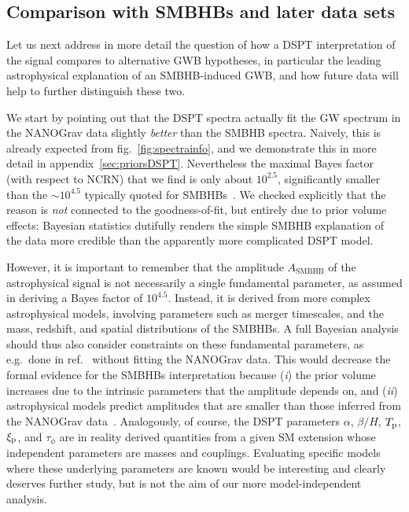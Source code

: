 \subsection{Comparison with SMBHBs and later data sets}
\label{sec:results_comp}

Let us next address in more detail the question of how a \ac{DSPT} interpretation of the signal compares to alternative \ac{GWB} hypotheses, in particular the leading astrophysical explanation of an \ac{SMBHB}-induced \ac{GWB}, and how future data will help to further distinguish these two.

We start by pointing out that the \ac{DSPT} spectra actually fit the \ac{GW} spectrum in the \ac{NANOGrav} data slightly \textit{better}  than the \ac{SMBHB} spectra. Naively, this is already expected from fig.~\ref{fig:spectrainfo}, and we demonstrate this in more detail in appendix~\ref{sec:priorsDSPT}. Nevertheless the maximal Bayes factor (with respect to \ac{NCRN}) that we find is only about $10^{2.5}$, significantly smaller than the $\sim10^{4.5}$ typically quoted for \acp{SMBHB}~\cite{NANOGrav:2020bcs}. We checked explicitly that the reason is \textit{not} connected to the goodness-of-fit, but entirely due to prior volume effects: Bayesian statistics dutifully renders the simple \ac{SMBHB} explanation of the data more credible than the apparently more complicated \ac{DSPT} model.

However, it is important to remember that the amplitude $A_\text{SMBHB}$ of the astrophysical signal is not necessarily a single fundamental parameter, as assumed in deriving a Bayes factor of $10^{4.5}$. Instead, it is derived from more complex astrophysical models, involving parameters such as merger timescales, and the mass, redshift, and spatial distributions of the \acp{SMBHB}. A full Bayesian analysis should thus also consider constraints on these  fundamental parameters, as e.g.~done in ref.~\cite{Casey-Clyde:2021xro} without fitting the \ac{NANOGrav} data. This would decrease the formal evidence for the \acp{SMBHB} interpretation because (\textit{i}) the prior volume increases due to the intrinsic parameters that the amplitude depends on, and (\textit{ii}) astrophysical models predict amplitudes that are smaller than those inferred from the \ac{NANOGrav} data~\cite{Casey-Clyde:2021xro,Kelley:2016gse, Kelley:2017lek, Antoniadis:2022pcn}. Analogously, of course, the \ac{DSPT} parameters $\alpha$, $\beta/H$, $T_{\text{p}}$, $\xi_{\text{p}}$, and $\tau_\phi$ are in reality derived quantities from a given SM extension whose independent parameters are masses and couplings. Evaluating specific models where these underlying parameters are known would be interesting and clearly deserves further study, but is not the aim of our more model-independent analysis.

